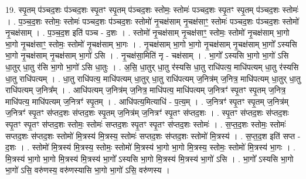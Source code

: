 \documentclass[17pt]{extarticle}
\begin{document}
19. स्पृ॒तम् प॑ञ्चद॒शः प॑ञ्चद॒शः स्पृ॒तꣳ स्पृ॒तम् प॑ञ्चद॒शः स्तोमः॒ स्तोमः॑ पञ्चद॒शः स्पृ॒तꣳ स्पृ॒तम् प॑ञ्चद॒शः स्तोमः॑ । . प॒ञ्च॒द॒शः स्तोमः॒ स्तोमः॑ पञ्चद॒शः प॑ञ्चद॒शः स्तोमो॑ नृ॒चक्ष॑साम् नृ॒चक्ष॑साꣳ॒॒ स्तोमः॑ पञ्चद॒शः प॑ञ्चद॒शः स्तोमो॑ नृ॒चक्ष॑साम् । . प॒ञ्च॒द॒श इति॑ पञ्च - द॒शः । . स्तोमो॑ नृ॒चक्ष॑साम् नृ॒चक्ष॑साꣳ॒॒ स्तोमः॒ स्तोमो॑ नृ॒चक्ष॑साम् भा॒गो भा॒गो नृ॒चक्ष॑साꣳ॒॒ स्तोमः॒ स्तोमो॑ नृ॒चक्ष॑साम् भा॒गः । . नृ॒चक्ष॑साम् भा॒गो भा॒गो नृ॒चक्ष॑साम् नृ॒चक्ष॑साम् भा॒गो᳚ ऽस्यसि भा॒गो नृ॒चक्ष॑साम् नृ॒चक्ष॑साम् भा॒गो॑ ऽसि । . नृ॒चक्ष॑सा॒मिति॑ नृ - चक्ष॑साम् । . भा॒गो᳚ ऽस्यसि भा॒गो भा॒गो॑ ऽसि धा॒तुर् धा॒तु र॑सि भा॒गो भा॒गो॑ ऽसि धा॒तुः । . अ॒सि॒ धा॒तुर् धा॒तु र॑स्यसि धा॒तु राधि॑पत्य॒ माधि॑पत्यम् धा॒तु र॑स्यसि धा॒तु राधि॑पत्यम् । . धा॒तु राधि॑पत्य॒ माधि॑पत्यम् धा॒तुर् धा॒तु राधि॑पत्यम् ज॒नित्र॑म् ज॒नित्र॒ माधि॑पत्यम् धा॒तुर् धा॒तु राधि॑पत्यम् ज॒नित्र᳚म् । . आधि॑पत्यम् ज॒नित्र॑म् ज॒नित्र॒ माधि॑पत्य॒ माधि॑पत्यम् ज॒नित्रꣳ॑ स्पृ॒तꣳ स्पृ॒तम् ज॒नित्र॒ माधि॑पत्य॒ माधि॑पत्यम् ज॒नित्रꣳ॑ स्पृ॒तम् । . आधि॑पत्य॒मित्याधि॑ - प॒त्य॒म् । . ज॒नित्रꣳ॑ स्पृ॒तꣳ स्पृ॒तम् ज॒नित्र॑म् ज॒नित्रꣳ॑ स्पृ॒तꣳ स॑प्तद॒शः स॑प्तद॒शः स्पृ॒तम् ज॒नित्र॑म् ज॒नित्रꣳ॑ स्पृ॒तꣳ स॑प्तद॒शः । . स्पृ॒तꣳ स॑प्तद॒शः स॑प्तद॒शः स्पृ॒तꣳ स्पृ॒तꣳ स॑प्तद॒शः स्तोमः॒ स्तोमः॑ सप्तद॒शः स्पृ॒तꣳ स्पृ॒तꣳ स॑प्तद॒शः स्तोमः॑ । . स॒प्त॒द॒शः स्तोमः॒ स्तोमः॑ सप्तद॒शः स॑प्तद॒शः स्तोमो॑ मि॒त्रस्य॑ मि॒त्रस्य॒ स्तोमः॑ सप्तद॒शः स॑प्तद॒शः स्तोमो॑ मि॒त्रस्य॑ । . स॒प्त॒द॒श इति॑ सप्त - द॒शः । . स्तोमो॑ मि॒त्रस्य॑ मि॒त्रस्य॒ स्तोमः॒ स्तोमो॑ मि॒त्रस्य॑ भा॒गो भा॒गो मि॒त्रस्य॒ स्तोमः॒ स्तोमो॑ मि॒त्रस्य॑ भा॒गः । . मि॒त्रस्य॑ भा॒गो भा॒गो मि॒त्रस्य॑ मि॒त्रस्य॑ भा॒गो᳚ ऽस्यसि भा॒गो मि॒त्रस्य॑ मि॒त्रस्य॑ भा॒गो॑ ऽसि । . भा॒गो᳚ ऽस्यसि भा॒गो भा॒गो॑ ऽसि॒ वरु॑णस्य॒ वरु॑णस्यासि भा॒गो भा॒गो॑ ऽसि॒ वरु॑णस्य । \newline
\end{document}
